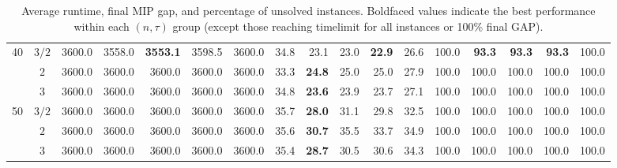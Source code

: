 \begin{table}[htbp]
{\begin{tabular}{cc||rrrrr||rrrrr||rrrrr}
40 & $3/2$ & 3600.0 & 3558.0 & \textbf{3553.1} & 3598.5 & 3600.0 & 34.8 & 23.1 & 23.0 & \textbf{22.9} & 26.6 & 100.0 & \textbf{93.3} & \textbf{93.3} & \textbf{93.3} & 100.0 \\
 & $2$ & 3600.0 & 3600.0 & 3600.0 & 3600.0 & 3600.0 & 33.3 & \textbf{24.8} & 25.0 & 25.0 & 27.9 & 100.0 & 100.0 & 100.0 & 100.0 & 100.0 \\
 & $3$ & 3600.0 & 3600.0 & 3600.0 & 3600.0 & 3600.0 & 34.8 & \textbf{23.6} & 23.9 & 23.7 & 27.1 & 100.0 & 100.0 & 100.0 & 100.0 & 100.0 \\
50 & $3/2$ & 3600.0 & 3600.0 & 3600.0 & 3600.0 & 3600.0 & 35.7 & \textbf{28.0} & 31.1 & 29.8 & 32.5 & 100.0 & 100.0 & 100.0 & 100.0 & 100.0 \\
 & $2$ & 3600.0 & 3600.0 & 3600.0 & 3600.0 & 3600.0 & 35.6 & \textbf{30.7} & 35.5 & 33.7 & 34.9 & 100.0 & 100.0 & 100.0 & 100.0 & 100.0 \\
 & $3$ & 3600.0 & 3600.0 & 3600.0 & 3600.0 & 3600.0 & 35.4 & \textbf{28.7} & 30.5 & 30.6 & 34.3 & 100.0 & 100.0 & 100.0 & 100.0 & 100.0 \\
\hline\hline
\end{tabular}
}
\caption{Average runtime, final MIP gap, and percentage of unsolved instances. Boldfaced values indicate the best performance within each $(n, \tau)$ group (except those reaching timelimit for all instances or 100\% final GAP).}
\label{tab:eilon-main-results}
\end{table}

